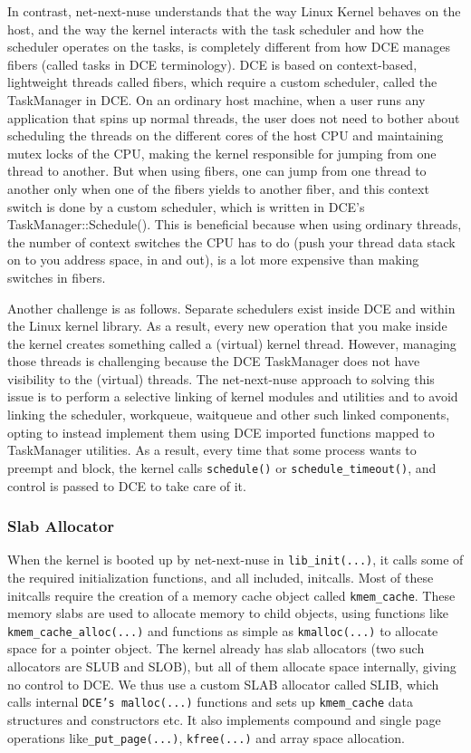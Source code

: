 \documentclass{sig-alternate}
\begin{document}
In contrast, net-next-nuse understands that the way Linux Kernel behaves on the host, and the way the kernel interacts with the task 
scheduler and how the scheduler operates on the tasks, is completely different from how DCE manages fibers (called tasks in DCE terminology). 
DCE is based on context-based, lightweight threads called fibers, which require a custom scheduler, called the TaskManager in DCE. On an ordinary
host machine, when a user runs any application that spins up normal threads, the user does not need to bother about scheduling the threads on 
the different cores of the host CPU and maintaining mutex locks of the CPU, making the kernel responsible for jumping from one thread to another. 
But when using fibers, one can jump from one thread to another only when one of the fibers yields to another fiber, and this context switch 
is done by a custom scheduler, which is written in DCE's TaskManager::Schedule(). This is beneficial because when using ordinary threads, 
the number of context switches the CPU has to do (push your thread data stack on to you address space, in and out), 
is a lot more expensive than making switches in fibers.

Another challenge is as follows.  Separate schedulers exist inside DCE and within the Linux kernel library. 
As a result, every new operation that you make inside the kernel creates something called a (virtual) kernel thread. 
However, managing those threads is challenging because the DCE TaskManager does not have visibility to the (virtual) threads.
The net-next-nuse approach to solving this issue is to perform  a selective linking of 
kernel modules and utilities and to avoid linking the scheduler, workqueue, waitqueue and other such linked components, opting to instead implement
them using DCE imported functions mapped to TaskManager utilities. As a result, every time that some process wants to preempt and block, the kernel calls 
\texttt{schedule()} or \texttt{schedule\_timeout()}, and control is passed to DCE to take care of it. 

\subsubsection{Slab Allocator}
When the kernel is booted up by net-next-nuse in \texttt{lib\_init(...)}, it calls some of the required initialization functions, and all included, initcalls. 
Most of these initcalls require the creation of a memory cache object called \texttt{kmem\_cache}. These memory slabs are used to allocate memory to child 
objects, using functions like \texttt{kmem\_cache\_alloc(...)} and functions as simple as \texttt{kmalloc(...)} to allocate space for a pointer object. The 
kernel already has slab allocators (two such allocators are SLUB and SLOB), but all of them allocate space internally, giving no control to DCE. We thus use a custom 
SLAB allocator called SLIB, which calls internal \texttt{DCE's malloc(...)} functions and sets up \texttt{kmem\_cache} data structures and constructors etc. It also 
implements compound and single page operations like\texttt{\_put\_page(...)}, \texttt{kfree(...)} and array space allocation. 
\end{document}

